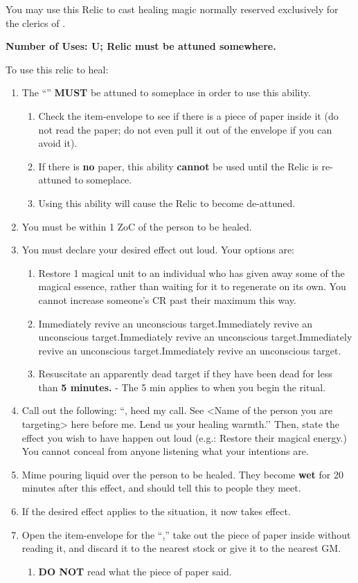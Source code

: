 \documentclass[green]{GL2020}
\begin{document}
\name{\gHealingRelic{}}

You may use this Relic to cast healing magic normally reserved exclusively for the clerics of \cFarmGod{}. 

\textbf{Number of Uses: U; Relic must be attuned somewhere.}

To use this relic to heal:
\begin{enumerate}
  \item The ``\iPitcher{}'' \textbf{MUST} be attuned to someplace in order to use this ability.
  \begin{enumerate}
    \item Check the item-envelope to see if there is a piece of paper inside it (do not read the paper; do not even pull it out of the envelope if you can avoid it).
    \item If there is \textbf{no} paper, this ability \textbf{cannot} be used until the Relic is re-attuned to someplace.
    \item Using this ability will cause the Relic to become de-attuned.
  \end{enumerate}
  \item You must be within 1 ZoC of the person to be healed.
  \item You must declare your desired effect out loud. Your options are:
  \begin{enumerate}
    \item Restore 1 magical unit to an individual who has given away some of the magical essence, rather than waiting for it to regenerate on its own. You cannot increase someone’s CR past their maximum this way.
    \item Immediately revive an unconscious target.Immediately revive an unconscious target.Immediately revive an unconscious target.Immediately revive an unconscious target.Immediately revive an unconscious target.
    \item Resuscitate an apparently dead target if they have been dead for less than \textbf{5 minutes.} - The 5 min applies to when you begin the ritual.
  \end{enumerate}
  \item Call out the following: ``\cFarmGod{}, heed my call. See <Name of the person you are targeting> here before me. Lend us your healing warmth.’’ Then, state the effect you wish to have happen out loud (e.g.: Restore their magical energy.) You cannot conceal from anyone listening what your intentions are.
  \item Mime pouring liquid over the person to be healed. They become \textbf{wet} for 20 minutes after this effect, and should tell this to people they meet.
  \item If the desired effect applies to the situation, it now takes effect.
  \item Open the item-envelope for the ``\iPitcher{},'' take out the piece of paper inside without reading it, and discard it to the nearest stock or give it to the nearest GM.
  \begin{enumerate}
    \item \textbf{DO NOT} read what the piece of paper said.
  \end{enumerate}
\end{enumerate}
\end{document}
